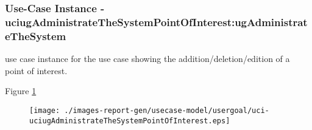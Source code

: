 
	\subsubsection{Use-Case Instance - uciugAdministrateTheSystemPointOfInterest:ugAdministrateTheSystem}
	
	use case instance for the use case  showing the addition/deletion/edition of a point of interest.		  
	\begin{operationmodel}
	
	\end{operationmodel} 

	
	Figure \ref{fig:lu.uni.lassy.excalibur.examples.icrash-RE-UC-uci-uciugAdministrateTheSystemPointOfInterest}
	
	\begin{figure}[htbp]
	\begin{center}
	
	\texttt{[image: ./images-report-gen/usecase-model/usergoal/uci-uciugAdministrateTheSystemPointOfInterest.eps]}
	\end{center}
	\caption[lu.uni.lassy.excalibur.examples.icrash Sequence Diagram: uci-uciugAdministrateTheSystemPointOfInterest]{}
	\label{fig:lu.uni.lassy.excalibur.examples.icrash-RE-UC-uci-uciugAdministrateTheSystemPointOfInterest}
	\end{figure}
	\vspace{0.5cm}
